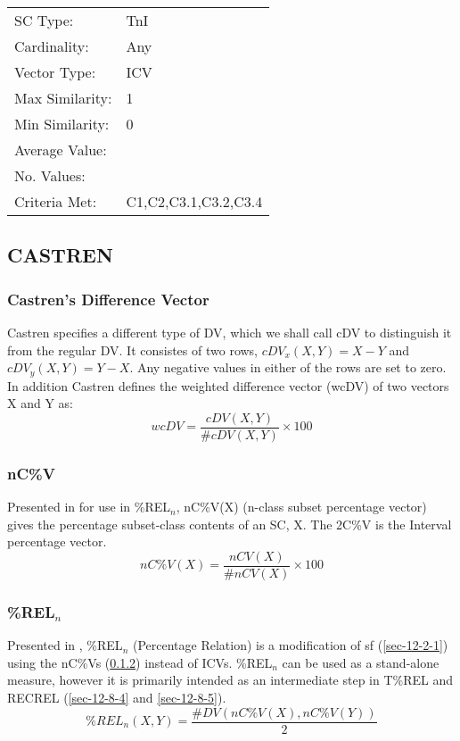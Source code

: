 \documentclass{article}
\begin{document}
\begin{center}
\begin{tabular}{ll}
 SC Type:         &  TnI                   \\
 Cardinality:     &  Any                   \\
 Vector Type:     &  ICV                   \\
 Max Similarity:  &  1                     \\
 Min Similarity:  &  0                     \\
 Average Value:   &                        \\
 No. Values:      &                        \\
 Criteria Met:    &  C1,C2,C3.1,C3.2,C3.4  \\
\end{tabular}
\end{center}
\subsection{CASTREN}
\label{sec-12-8}
\subsubsection{Castren's Difference Vector}
\label{sec-12-8-1}

Castren specifies a different type of DV, which we shall call cDV to
distinguish it from the regular DV. It consistes of two rows,
$cDV_{x}(X,Y)=X-Y$ and $cDV_{y}(X,Y)=Y-X$. Any negative values in
either of the rows are set to zero.  In addition Castren defines the
weighted difference vector (wcDV) of two vectors X and Y as:
$$wcDV=\frac{cDV(X,Y)}{\#cDV(X,Y)}\times 100$$
\subsubsection{nC\%V}
\label{sec-12-8-2}

Presented in \citet{Castren1994} for use in \%REL$_{n}$, nC\%V(X) (n-class
subset percentage vector) gives the percentage subset-class contents
of an SC, X. The 2C\%V is the Interval percentage vector.
$$nC\%V(X)=\frac{nCV(X)}{\#nCV(X)}\times 100$$
\subsubsection{\%REL$_{n}$}
\label{sec-12-8-3}

Presented in \citet{Castren1994}, \%REL$_{n}$ (Percentage Relation) is a
modification of sf (\ref{sec-12-2-1}) using the nC\%Vs (\ref{sec-12-8-2}) instead of
ICVs. \%REL$_{n}$ can be used as a stand-alone measure, however it is
primarily intended as an intermediate step in T\%REL and RECREL (\ref{sec-12-8-4}
and \ref{sec-12-8-5}). $$\%REL_n(X,Y)=\frac{\#DV(nC\%V(X),nC\%V(Y))}{2}$$
\end{document}
